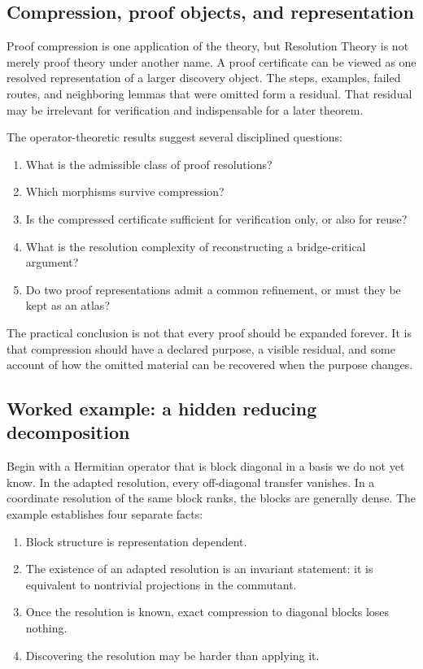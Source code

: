 \documentclass[11pt]{article}
\theoremstyle{definition}
\theoremstyle{remark}
\begin{document}
\subsection{Compression, proof objects, and representation}

Proof compression is one application of the theory, but Resolution Theory is not merely proof theory under another name.  A proof certificate can be viewed as one resolved representation of a larger discovery object.  The steps, examples, failed routes, and neighboring lemmas that were omitted form a residual.  That residual may be irrelevant for verification and indispensable for a later theorem.

The operator-theoretic results suggest several disciplined questions:
\begin{enumerate}[label=\arabic*.]
\item What is the admissible class of proof resolutions?
\item Which morphisms survive compression?
\item Is the compressed certificate sufficient for verification only, or also for reuse?
\item What is the resolution complexity of reconstructing a bridge-critical argument?
\item Do two proof representations admit a common refinement, or must they be kept as an atlas?
\end{enumerate}

The practical conclusion is not that every proof should be expanded forever.  It is that compression should have a declared purpose, a visible residual, and some account of how the omitted material can be recovered when the purpose changes.

\subsection{Worked example: a hidden reducing decomposition}

Begin with a Hermitian operator that is block diagonal in a basis we do not yet know.  In the adapted resolution, every off-diagonal transfer vanishes.  In a coordinate resolution of the same block ranks, the blocks are generally dense.  The example establishes four separate facts:

\begin{enumerate}[label=\arabic*.]
\item Block structure is representation dependent.
\item The existence of an adapted resolution is an invariant statement: it is equivalent to nontrivial projections in the commutant.
\item Once the resolution is known, exact compression to diagonal blocks loses nothing.
\item Discovering the resolution may be harder than applying it.
\end{enumerate}
\end{document}
